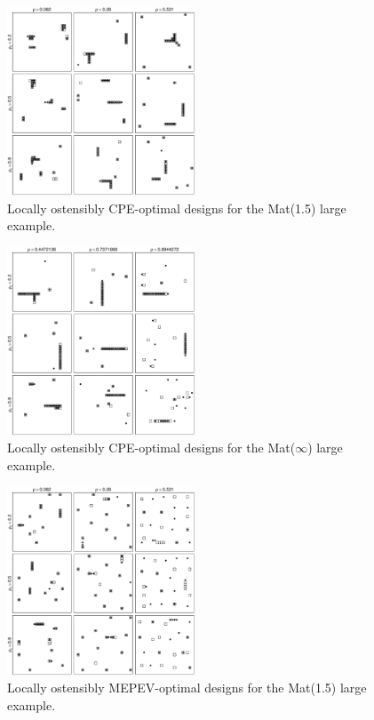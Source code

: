 \documentclass[12pt]{article}
\begin{document}
        \begin{figure}
        \begin{center}
        \includegraphics[width=0.5\textwidth]{saacovest_matern2.pdf}
        \caption{Locally ostensibly CPE-optimal designs for the Mat(1.5) large example.}\label{fig:mpevlarger}
        \end{center}
        \end{figure}


        \begin{figure}
        \begin{center}
        \includegraphics[width=0.5\textwidth]{saacovest_matern1.pdf}
        \caption{Locally ostensibly CPE-optimal designs for the Mat($\infty$) large example.}\label{fig:mpevlarger}
        \end{center}
        \end{figure}

        \begin{figure}
        \begin{center}
        \includegraphics[width=0.5\textwidth]{saaeblup_matern2.pdf}
        \caption{Locally ostensibly MEPEV-optimal designs for the Mat(1.5) large example.}\label{fig:mepevlarger}
        \end{center}
        \end{figure}
\end{document}
